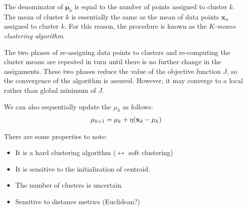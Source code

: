 The denominator of $\boldsymbol{\mu}_k$ is equal to the number of points assigned to cluster $k$. The mean of cluster $k$ is essentially the same as the mean of data points $\mathbf{x}_n$ assigned to cluster $k$. For this reason, the procedure is known as the \textit{$K$-means clustering algorithm}. 

The two phases of re-assigning data points to clusters and re-computing the cluster means are repeated in turn until there is no further change in the assignments. These two phases reduce the value of the objective function $J$, so the convergence of the algorithm is assured. However, it may converge to a local rather than global minimum of $J$. 

We can also sequentially update the $\mu_k$ as follows: 
\begin{align*}
	\mu_{k+1} = \mu_{k} + \eta({\mathbf{x}}_k-\mu_{k})
\end{align*}

There are some properties to note:
\begin{itemize}
	\item It is a hard clustering algorithm ($\leftrightarrow$ soft clustering)
	\item It is sensitive to the initialization of centroid.
	\item The number of clusters is uncertain. 
	\item Sensitive to distance metrics (\eg Euclidean?)
\end{itemize}


